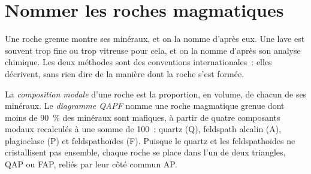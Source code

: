 \section{Nommer les roches magmatiques}\label{sec:b2:magmatic-series:naming}

Une roche grenue montre ses minéraux, et on la nomme d'après eux. Une lave est souvent trop fine
ou trop vitreuse pour cela, et on la nomme d'après son analyse chimique. Les deux méthodes sont
des conventions internationales~: elles décrivent, sans rien dire de la manière dont la roche
s'est formée.

\begin{definition}\label{def:b2:magmatic-series:qapf}
La \emph{composition modale} d'une roche est la proportion, en
volume, de chacun de ses minéraux. Le \emph{diagramme QAPF} nomme une
roche magmatique grenue dont moins de \qty{90}{\percent} des minéraux sont mafiques, à partir de
quatre composants modaux recalculés à une somme de 100~: quartz (Q), feldspath alcalin (A),
plagioclase (P) et feldspathoïdes (F). Puisque le quartz et les feldspathoïdes ne cristallisent pas
ensemble, chaque roche se place dans l'un de deux triangles, QAP ou FAP, reliés par leur côté
commun AP.
\end{definition}

